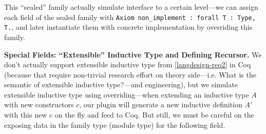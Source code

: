 This ``sealed'' family actually simulate interface to a certain level---we can assign each field of the sealed family with \texttt{Axiom non_implement : forall {T : Type}, T.}, and later instantiate them with concrete implementation by overriding this family.



\textbf{Special Fields: ``Extensible'' Inductive Type and Defining Recursor.}
We don't actually support extensible inductive type from \ref{langdesign-req2} in Coq (because that require non-trivial research effort on theory side---i.e. {What is the semantic of extensible inductive type?}---and engineering), but we simulate extensible inductive type using overriding---when extending an inductive type $A$ with new constructors $c$, our plugin will generate a new inductive definition $A'$ with this new $c$ on the fly and feed to Coq.  But still, we must be careful on the exposing data in the family type (module type) for the following field.  

